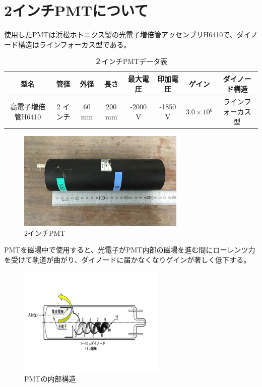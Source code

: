 \section{2インチPMTについて}
使用したPMTは浜松ホトニクス製の光電子増倍管アッセンブリH6410で、ダイノード構造はラインフォーカス型である。
\begin{table}[htb]
	\begin{center}
	
	  \begin{tabular}{|c|c|c|c|c|c|c|c|} \hline
		型名& 管径 & 外径 & 長さ & 最大電圧 & 印加電圧 & ゲイン & ダイノード構造 \\ \hline \hline
		高電子増倍管H6410 & 2 インチ & 60 mm & 200 mm & -2000 V & -1850 V & $3.0\times10{^{6}}$ &ラインフォーカス型 \\ \hline
	\end{tabular}
	  \caption{２インチPMTデータ表}
	\end{center}
\end{table}

\begin{figure}[H]
	\centering
		\includegraphics[width=8cm]{fig/iguchi/PMTphoto.jpg}
	\caption{2インチPMT}
	\label{PMTphoto}
\end{figure}

PMTを磁場中で使用すると、光電子がPMT内部の磁場を進む間にローレンツ力を受けて軌道が曲がり、ダイノードに届かなくなりゲインが著しく低下する。

\begin{figure}[H]
	\centering
		\includegraphics[width=7cm]{fig/iguchi/PMTinner.pdf}
	\caption{PMTの内部構造}
	\label{PMTinner}
\end{figure}



